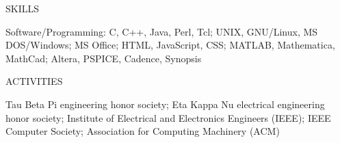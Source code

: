 \documentclass[letterpaper,10pt]{article}
\begin{document}
\bigskip

\noindent SKILLS

\parbox[t]{\columnwidth}{Software/Programming: C, C++, Java, Perl,
Tcl; UNIX, GNU/Linux, MS DOS/Windows; MS Office; HTML, JavaScript,
CSS; MATLAB, Mathematica, MathCad; Altera, PSPICE, Cadence, Synopsis}

\bigskip

\noindent ACTIVITIES

\parbox[t]{\columnwidth}{Tau Beta Pi engineering honor society; Eta
Kappa Nu electrical engineering honor society; Institute of Electrical
and Electronics Engineers (IEEE); IEEE Computer Society; Association
for Computing Machinery (ACM)}
\end{document}
